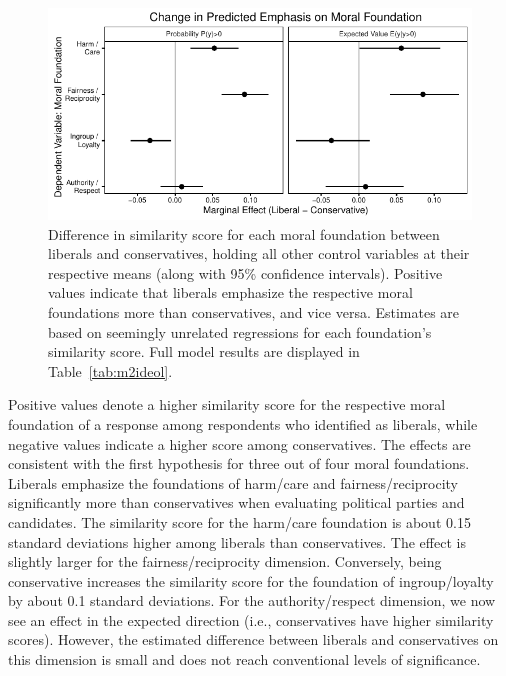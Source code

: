 \documentclass[12pt]{article}
\begin{document}
\begin{figure}[h]\centering
\includegraphics{../calc/fig/tobit_ideol.pdf}
\caption{Difference in similarity score for each moral foundation between liberals and conservatives, holding all other control variables at their respective means (along with 95\% confidence intervals). Positive values indicate that liberals emphasize the respective moral foundations more than conservatives, and vice versa. Estimates are based on seemingly unrelated regressions for each foundation's similarity score. Full model results are displayed in Table~\ref{tab:m2ideol}.}\label{fig:ols_ideol}
\end{figure}

Positive values denote a higher similarity score for the respective moral foundation of a response among respondents who identified as liberals, while negative values indicate a higher score among conservatives. The effects are consistent with the first hypothesis for three out of four moral foundations. Liberals emphasize the foundations of harm/care and fairness/reciprocity significantly more than conservatives when evaluating political parties and candidates. The similarity score for the harm/care foundation is about 0.15 standard deviations higher among liberals than conservatives. The effect is slightly larger for the fairness/reciprocity dimension. Conversely, being conservative increases the similarity score for the foundation of ingroup/loyalty by about 0.1 standard deviations. For the authority/respect dimension, we now see an effect in the expected direction (i.e., conservatives have higher similarity scores). However, the estimated difference between liberals and conservatives on this dimension is small and does not reach conventional levels of significance.
\end{document}
